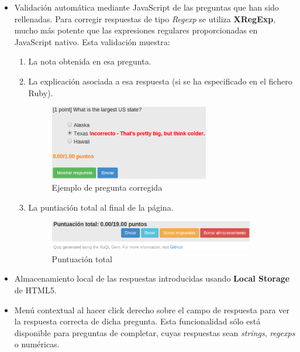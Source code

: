 \begin{itemize}
\begin{itemize}
\begin{itemize}
    \end{itemize}
  \end{itemize}
  
  \item Validaci\'on autom\'atica mediante JavaScript de las preguntas que han sido rellenadas. Para corregir respuestas de tipo \textit{Regexp}
  se utiliza {\bfseries XRegExp}, mucho m\'as potente que las expresiones regulares proporcionadas en JavaScript nativo. Esta validaci\'on muestra:
  \begin{enumerate}
    \item La nota obtenida en esa pregunta.
    \item La explicaci\'on asociada a esa respuesta (si se ha especificado en el fichero Ruby).
    \begin{figure}[!th]
    \begin{center}
    \includegraphics[width=0.7\textwidth]{images/validation1.eps}
    \caption{Ejemplo de pregunta corregida}
    \label{fig:validation1}
    \end{center}
    \end{figure}
    \newpage
    
    \item La puntiaci\'on total al final de la p\'agina.
    \begin{figure}[!th]
    \begin{center}
    \includegraphics[width=0.9\textwidth]{images/validation2.eps}
    \caption{Puntuaci\'on total}
    \label{fig:validation2}
    \end{center}
    \end{figure}
    
  \end{enumerate}
  
  \item Almacenamiento local de las respuestas introducidas usando {\bfseries Local Storage} de HTML5.
  \item Men\'u contextual al hacer click derecho sobre el campo de respuesta para ver la respuesta correcta de dicha pregunta.
  Esta funcionalidad s\'olo est\'a disponible para preguntas de completar, cuyas respuestas sean \textit{strings},
  \textit{regexps} o num\'ericas.
  

\end{itemize}
